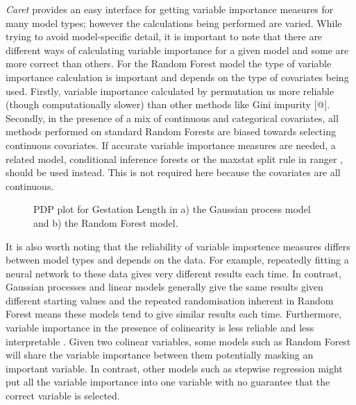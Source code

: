 \documentclass[10pt,]{article}
\begin{document}
\emph{Caret} provides an easy interface for getting variable importance measures for many model types; however the calculations being performed are varied.
While trying to avoid model-specific detail, it is important to note that there are different ways of calculating variable importance for a given model \citep{oppel2009alternative, seifert2019surrogate} and some are more correct than others.
For the Random Forest model the type of variable importance calculation is important and depends on the type of covariates being used.
Firstly, variable importance calculated by permutation us more reliable (though computationally slower) than other methods like Gini impurity {[}@{]}.
Secondly, in the presence of a mix of continuous and categorical covariates, all methods performed on standard Random Forests are biased towards selecting continuous covariates.
If accurate variable importance measures are needed, a related model, conditional inference forests \citep{hothorn2006unbiased} or the maxstat split rule in ranger \citep{wright2017unbiased}, should be used instead.
This is not required here because the covariates are all continuous.

\begin{figure}[t!]
  \centering

  \label{fig:pdp}
  \caption{
    PDP plot for Gestation Length in a) the Gaussian process model and b) the Random Forest model.
  }
\end{figure}

It is also worth noting that the reliability of variable importence measures differs between model types and depends on the data.
For example, repeatedly fitting a neural network to these data gives very different results each time.
In contrast, Gaussian processes and linear models generally give the same results given different starting values and the repeated randomisation inherent in Random Forest means these models tend to give similar results each time.
Furthermore, variable importance in the presence of colinearity is less reliable and less interpretable \citep{dormann2013collinearity}.
Given two colinear variables, some models such as Random Forest will share the variable importance between them potentially masking an important variable.
In contrast, other models such as stepwise regression might put all the variable importance into one variable with no guarantee that the correct variable is selected.
\end{document}
